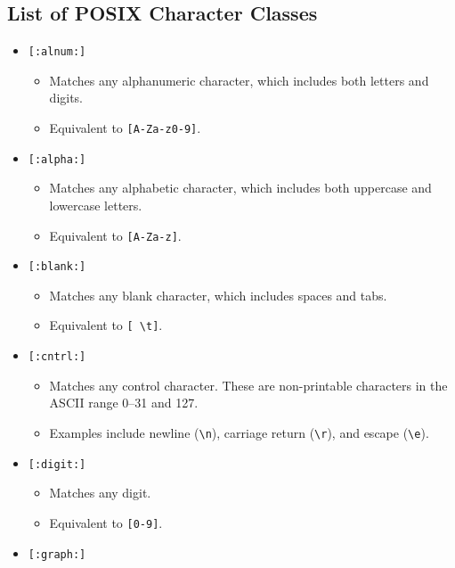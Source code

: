 \documentclass{report}
\begin{document}
    \subsection{List of POSIX Character Classes}
    \begin{itemize}
        \item \texttt{[:alnum:]}
            \begin{itemize}
                \item Matches any alphanumeric character, which includes both letters and digits.
                \item Equivalent to \texttt{[A-Za-z0-9]}.
            \end{itemize}
        \item \texttt{[:alpha:]}
            \begin{itemize}
                \item Matches any alphabetic character, which includes both uppercase and lowercase letters.
                \item Equivalent to \texttt{[A-Za-z]}.
            \end{itemize}
        \item \texttt{[:blank:]}
            \begin{itemize}
                \item Matches any blank character, which includes spaces and tabs.
                \item Equivalent to \texttt{[ \textbackslash{}t]}.
            \end{itemize}
        \item \texttt{[:cntrl:]}
            \begin{itemize}
                \item Matches any control character. These are non-printable characters in the ASCII range 0–31 and 127.
                \item Examples include newline (\texttt{\textbackslash{}n}), carriage return (\texttt{\textbackslash{}r}), and escape (\texttt{\textbackslash{}e}).
            \end{itemize}
        \item \texttt{[:digit:]}
            \begin{itemize}
                \item Matches any digit.
                \item Equivalent to \texttt{[0-9]}.
            \end{itemize}
        \item \texttt{[:graph:]}

\end{itemize}
\end{document}
